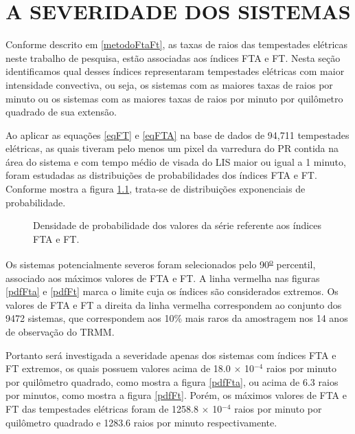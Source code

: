 \chapter{A SEVERIDADE DOS SISTEMAS}

Conforme descrito em \ref{metodoFtaFt}, as taxas de raios das tempestades elétricas neste trabalho de pesquisa, estão associadas aos índices FTA e FT.  Nesta seção identificamos qual desses índices representaram tempestades elétricas com maior intensidade convectiva, ou seja, os sistemas com as maiores taxas de raios por minuto ou os sistemas com as maiores taxas de raios por minuto por quilômetro quadrado de sua extensão. 

Ao aplicar as equações \ref{eqFT} e \ref{eqFTA} na base de dados de 94,711 tempestades elétricas, as quais tiveram pelo menos um pixel da varredura do PR contida na área do sistema e com tempo médio de visada do LIS maior ou igual a 1 minuto, foram estudadas as distribuições de probabilidades dos índices FTA e FT. Conforme mostra a figura \ref{seriesFtaFt}, trata-se de distribuições exponenciais de probabilidade. 

\begin{figure}[!hb]
  \centering 
   \caption{Densidade de probabilidade dos valores da série referente aos índices FTA e FT.}
   \label{seriesFtaFt}
\end{figure}

Os sistemas potencialmente severos foram selecionados pelo 90\textsuperscript{\underline{o}} percentil, associado aos máximos valores de FTA e FT. A linha vermelha nas figuras \ref{pdfFta} e \ref{pdfFt} marca o limite cuja os índices são considerados extremos. Os valores de FTA e FT a direita da linha vermelha correspondem ao conjunto dos 9472 sistemas, que correspondem aos 10\% mais raros da amostragem nos 14 anos de observação do TRMM.  

Portanto será investigada a severidade apenas dos sistemas com índices FTA e FT extremos, os quais possuem valores acima de 18.0 $\times$ 10$^{-4}$ raios por minuto por quilômetro quadrado, como mostra a figura \ref{pdfFta}, ou acima de 6.3 raios por minutos, como mostra a figura \ref{pdfFt}. Porém, os máximos valores de FTA e FT das tempestades elétricas foram de 1258.8 $\times$ 10$^{-4}$ raios por minuto por quilômetro quadrado e 1283.6 raios por minuto respectivamente. 


